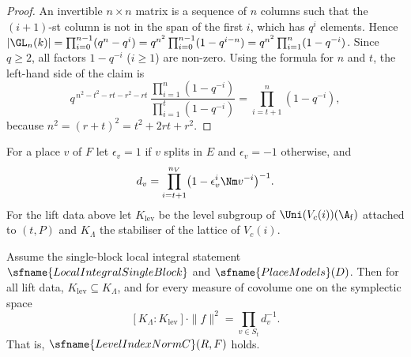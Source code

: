 \begin{proof}
An invertible $n\times n$ matrix is a sequence of $n$ columns such that the $(i+1)$-st column is not in the span of the first
$i$, which has $q^i$ elements. Hence
$|\GL_n(k)|=\prod_{i=0}^{n-1}(q^n-q^i)=q^{n^2}\prod_{i=0}^{n-1}(1-q^{i-n})=q^{n^2}\prod_{i=1}^{n}(1-q^{-i})$. Since $q\ge2$, all
factors $1-q^{-i}$ ($i\ge1$) are non-zero. Using the formula for $n$ and $t$, the left-hand side of the claim is
\[
q^{\,n^2-t^2-rt-r^2-rt}\,\frac{\prod_{i=1}^{n}(1-q^{-i})}{\prod_{i=1}^{t}(1-q^{-i})}=\prod_{i=t+1}^{n}(1-q^{-i}),
\]
because $n^2=(r+t)^2=t^2+2rt+r^2$.
\end{proof}

For a place $v$ of $F$ let $\epsilon_v=1$ if $v$ splits in $E$ and $\epsilon_v=-1$ otherwise, and
\[
d_v=\prod_{i=t+1}^{n_V}\bigl(1-\epsilon_v^i\Nm v^{-i}\bigr)^{-1}.
\]
For the lift data above let $K_{\mathrm{lev}}$ be the level subgroup of $\Uni(V_c(i))(\A_{\mathrm f})$ attached to $(t,P)$ and $K_\Lambda$
the stabiliser of the lattice of $V_c(i)$.

\begin{theorem}\label{pf:sh-theta:levelindex}
Assume the single-block local integral statement $\sfname{LocalIntegralSingleBlock}$ and $\sfname{PlaceModels}(D)$. Then for all lift
data, $K_{\mathrm{lev}}\subseteq K_\Lambda$, and for every measure of covolume one on the symplectic space
\[
[K_\Lambda:K_{\mathrm{lev}}]\cdot\|f\|^2=\prod_{v\in S_t}d_v^{-1}.
\]
That is, $\sfname{LevelIndexNormC}(R,F)$ holds.
\end{theorem}

